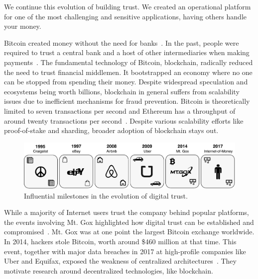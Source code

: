 We continue this evolution of building trust.
We created an operational platform for one of the most challenging and sensitive applications, having others handle your money.

Bitcoin created money without the need for banks~\cite{nakamoto2008bitcoin}.
In the past, people were required to trust a central bank and a host of other intermediaries when making payments~\cite{kokkola2011payment}.
The fundamental technology of Bitcoin, blockchain, radically reduced the need to trust financial middlemen.
It bootstrapped an economy where no one can be stopped from spending their money.
Despite widespread speculation and ecosystems being worth billions, blockchain in general suffers from scalability issues due to inefficient mechanisms for fraud prevention.
Bitcoin is theoretically limited to seven transactions per second and Ethereum has a throughput of around twenty transactions per second~\cite{vukolic2015quest}.
Despite various scalability efforts like proof-of-stake and sharding, broader adoption of blockchain stays out.

\begin{figure}[!t]
	\centering
	\includegraphics[width=\linewidth]{iom/assets/timeline}
	\caption{Influential milestones in the evolution of digital trust.}
	\label{fig:trust_evolution}
\end{figure}

While a majority of Internet users trust the company behind popular platforms, the events involving Mt. Gox highlighted how digital trust can be established and compromised~\cite{mcmillan2014inside}.
Mt. Gox was at one point the largest Bitcoin exchange worldwide.
In 2014, hackers stole Bitcoin, worth around \$460 million at that time. %
This event, together with major data breaches in 2017 at high-profile companies like Uber and Equifax, exposed the weakness of centralized architectures~\cite{uber2017hack}.
They motivate research around decentralized technologies, like blockchain. %

